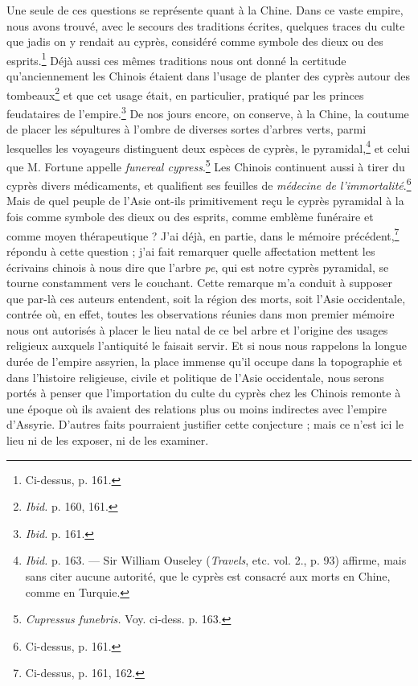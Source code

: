 \documentclass{article}
\begin{document}
Une seule de ces questions se représente quant à la Chine. Dans ce vaste empire, nous avons trouvé, avec le secours des traditions écrites, quelques traces du culte que jadis on y rendait au cyprès, considéré comme symbole des dieux ou des esprits.\footnote{Ci-dessus, p. 161.} Déjà aussi ces mêmes traditions nous ont donné la certitude qu'anciennement les Chinois étaient dans l'usage de planter des cyprès autour des tombeaux\footnote{\emph{Ibid.} p. 160, 161.} et que cet usage était, en particulier, pratiqué par les princes feudataires de l'empire.\footnote{\emph{Ibid.} p. 161.} De nos jours encore, on conserve, à la Chine, la coutume de placer les sépultures à l'ombre de diverses sortes d'arbres verts, parmi lesquelles les voyageurs distinguent deux espèces de cyprès, le pyramidal,\footnote{\emph{Ibid.} p. 163. --- Sir William Ouseley (\emph{Travels}, etc. vol. 2., p. 93) affirme, mais sans citer aucune autorité, que le cyprès est consacré aux morts en Chine, comme en Turquie.} et celui que M. Fortune appelle \emph{funereal cypress}.\footnote{\emph{Cupressus funebris.} Voy. ci-dess. p. 163.} Les Chinois continuent aussi à tirer du cyprès divers médicaments, et qualifient ses feuilles de \emph{médecine de l'immortalité}.\footnote{Ci-dessus, p. 161.} Mais de quel peuple de l'Asie ont-ils primitivement reçu le cyprès pyramidal à la fois comme symbole des dieux ou des esprits, comme emblème funéraire et comme moyen thérapeutique ? J'ai déjà, en partie, dans le mémoire précédent,\footnote{Ci-dessus, p. 161, 162.} répondu à cette question ; j'ai fait remarquer quelle affectation mettent les écrivains chinois à nous dire que l'arbre \emph{pe}, qui est notre cyprès pyramidal, se tourne constamment vers le couchant. Cette remarque m'a conduit à supposer que par-là ces auteurs entendent, soit la région des morts, soit l'Asie occidentale, contrée où, en effet, toutes les observations réunies dans mon premier mémoire nous ont autorisés à placer le lieu natal de ce bel arbre et l'origine des usages religieux auxquels l'antiquité le faisait servir. Et si nous nous rappelons la longue durée de l'empire assyrien, la place immense qu'il occupe dans la topographie et dans l'histoire religieuse, civile et politique de l'Asie occidentale, nous serons portés à penser que l'importation du culte du cyprès chez les Chinois remonte à une époque où ils avaient des relations plus ou moins indirectes avec l'empire d'Assyrie. D'autres faits pourraient justifier cette conjecture ; mais ce n'est ici le lieu ni de les exposer, ni de les examiner.
\end{document}
